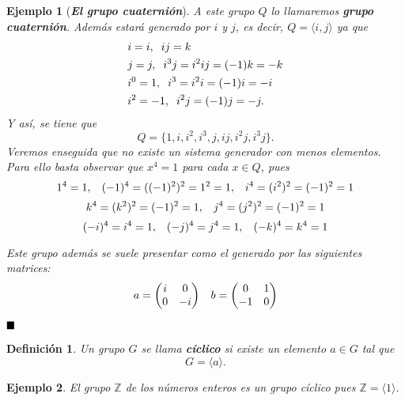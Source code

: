 \documentclass[12pt]{article}
\newtheorem{definition}[theorem]{Definición}
\newtheorem{example}{Ejemplo}[theorem]
\begin{document}
\begin{example}[\textbf{\textit{El grupo cuaternión}}]
A este grupo $Q$ lo llamaremos \textbf{\textit{grupo cuaternión}}. Además estará generado por $i$ y $j$, es decir, $Q = \langle i,j \rangle$ ya que \begin{equation*}
\begin{aligned}
&i = i, \hspace{0.2cm} ij = k\\
&j = j, \hspace{0.2cm} i^{3}j = i^{2}ij =(-1)k = -k\\
&i^{0} = 1, \hspace{0.2cm} i^{3} = i^{2}i = (-1)i = -i\\
&i^{2} = -1, \hspace{0.2cm} i^{2}j = (-1)j = -j.
\end{aligned}
\end{equation*}
Y así, se tiene que $$Q = \lbrace 1, i, i^{2}, i^{3}, j, ij, i^{2}j, i^{3}j \rbrace.$$
Veremos enseguida que no existe un sistema generador con menos elementos. Para ello basta observar que $x^4 = 1$ para cada $x \in Q$, pues $$1^4 = 1,\hspace{0.3cm} (-1)^4 = ((-1)^2)^2 = 1^2 = 1, \hspace{0.3cm} i^4 = (i^2)^2 = (-1)^2 = 1$$ $$k^4 = (k^2)^2 = (-1)^2 = 1, \hspace{0.3cm} j^4 = (j^2)^2 = (-1)^2 = 1$$ $$(-i)^4 = i^4= 1, \hspace{0.3cm} (-j)^4 =j^4= 1,\hspace{0.3cm} (-k)^4 = k^4= 1$$ 

Este grupo además se suele presentar como el generado por las siguientes matrices: $$a = \left(
\begin{matrix}
i & 0 \\
0 & -i
\end{matrix}
\right) \hspace{0.3cm} b = \left(
\begin{matrix}
0 & 1 \\
-1 & 0
\end{matrix}
\right)$$

\end{example}

$\hfill \blacksquare$

\begin{definition}Un grupo $G$ se llama \textbf{cíclico} si existe un elemento $a \in G$ tal que $$G = \langle a \rangle.$$
\end{definition}

\begin{example}El grupo $\mathbb{Z}$ de los números enteros es un grupo cíclico pues $\mathbb{Z} = \langle 1 \rangle$.
\end{example}
\end{document}
